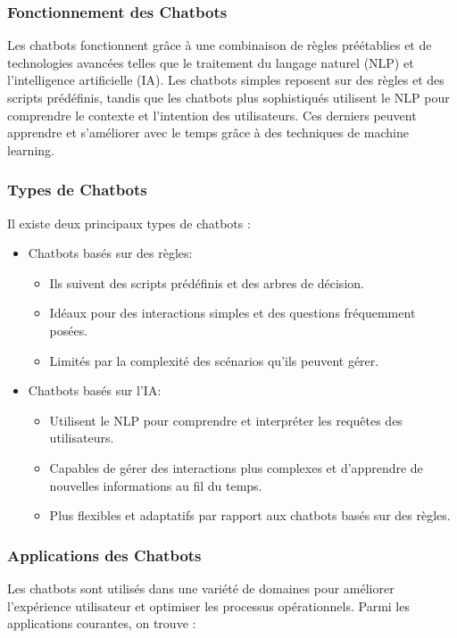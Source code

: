 \subsubsection{Fonctionnement des Chatbots}

\hspace{16pt}Les chatbots fonctionnent grâce à une combinaison de règles préétablies et de technologies avancées telles que le traitement du langage naturel (NLP) et l'intelligence artificielle (IA). Les chatbots simples reposent sur des règles et des scripts prédéfinis, tandis que les chatbots plus sophistiqués utilisent le NLP pour comprendre le contexte et l'intention des utilisateurs. Ces derniers peuvent apprendre et s'améliorer avec le temps grâce à des techniques de machine learning.

\subsubsection{Types de Chatbots}

\hspace{16pt}Il existe deux principaux types de chatbots :
\begin{itemize}
  \item Chatbots basés sur des règles:
  \begin{itemize}
    \item Ils suivent des scripts prédéfinis et des arbres de décision.
    \item Idéaux pour des interactions simples et des questions fréquemment posées.
    \item Limités par la complexité des scénarios qu'ils peuvent gérer.
  \end{itemize}
  
  \item Chatbots basés sur l'IA:
  \begin{itemize}
    \item Utilisent le NLP pour comprendre et interpréter les requêtes des utilisateurs.
    \item Capables de gérer des interactions plus complexes et d'apprendre de nouvelles informations au fil du temps.
    \item Plus flexibles et adaptatifs par rapport aux chatbots basés sur des règles.
  \end{itemize}
\end{itemize}

\subsubsection{Applications des Chatbots}
\hspace{16pt}Les chatbots sont utilisés dans une variété de domaines pour améliorer l'expérience utilisateur et optimiser les processus opérationnels. Parmi les applications courantes, on trouve :

